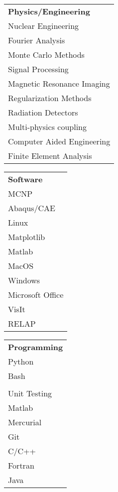 \\[2mm]
\begin{minipage}{0.32\textwidth}
\begin{tabular}{l}
	{\large\textbf{Physics/Engineering}} \\
	\highskillbw Nuclear Engineering \\
	\highskillbw Fourier Analysis \\ 
	\highskillbw Monte Carlo Methods \\
	\medskillbw Signal Processing \\
	\medskillbw Magnetic Resonance Imaging \\ 
	\medskillbw Regularization Methods  \\
	\medskillbw Radiation Detectors \\
	\lowskillbw Multi-physics coupling \\
	\lowskillbw Computer Aided Engineering \\
	\lowskillbw Finite Element Analysis \\
\end{tabular}
\end{minipage}%
\begin{minipage}{0.2\textwidth}
	\begin{center}
\begin{tabular}{l}
	{\large\textbf{Software}} \\
	\highskillbw \textsc{MCNP} \\
	\highskillbw Abaqus/CAE \\
	\highskillbw Linux \\ 
	\highskillbw Matplotlib \\ 
	\highskillbw Matlab \\
	\highskillbw MacOS \\
	\medskillbw Windows \\
	\medskillbw Microsoft Office \\
	\lowskillbw VisIt \\
	\lowskillbw RELAP
\end{tabular}
	\end{center}
\end{minipage}%
\begin{minipage}{0.23\textwidth}
	\begin{center}
\begin{tabular}{l}
	{\large\textbf{Programming}} \\
	\highskillbw Python \\
	\highskillbw Bash \\ 
	\highskillbw {\fontfamily{ptm}\selectfont \LaTeX} \\ 
	\highskillbw Unit Testing \\
	\highskillbw Matlab \\
	\highskillbw Mercurial \\
	\medskillbw Git \\
	\medskillbw C/C++ \\
	\medskillbw Fortran \\
	\lowskillbw Java \\
\end{tabular}
	\end{center}
\end{minipage}%
